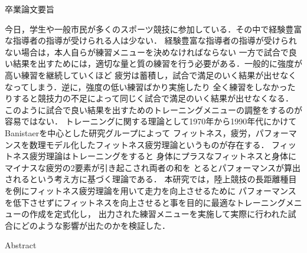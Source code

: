 \documentclass[12pt,fleqn]{jreport}
\begin{document}
\begin{center}
  {\huge 卒業論文要旨}
\end{center}
\vspace{3cm}
\large
今日，学生や一般市民が多くのスポーツ競技に参加している．その中で経験豊富な指導者の指導が受けられる人は少ない．
経験豊富な指導者の指導が受けられない場合は，本人自らが練習メニューを決めなければならない
一方で試合で良い結果を出すためには，適切な量と質の練習を行う必要がある．一般的に強度が高い練習を継続していくほど
疲労は蓄積し，試合で満足のいく結果が出せなくなってしまう．逆に，強度の低い練習ばかり実施したり
全く練習をしなかったりすると競技力の不足によって同じく試合で満足のいく結果が出せなくなる．
このように試合で良い結果を出すためのトレーニングメニューの調整をするのが容易ではない．
トレーニングに関する理論として1970年から1990年代にかけてBanistaerを中心とした研究グループによって
フィットネス，疲労，パフォーマンスを数理モデル化したフィットネス疲労理論というものが存在する\cite{banister}．
フィットネス疲労理論\cite{banister}はトレーニングをすると
身体にプラスなフィットネスと身体にマイナスな疲労の2要素が引き起こされ両者の和を
とるとパフォーマンスが算出されるという考え方に基づく理論である．
本研究では，陸上競技の長距離種目を例にフィットネス疲労理論\cite{banister}を用いて走力を向上させるために
パフォーマンスを低下させずにフィットネスを向上させると事を目的に最適なトレーニングメニューの作成を定式化し，
出力された練習メニューを実施して実際に行われた試合にどのような影響が出たのかを検証した．
\newpage
\thispagestyle{empty}

\begin{center}
  {\huge Abstract}
\end{center}
\vspace{3cm}



\newpage
{}   %
\setlength{\baselineskip}{20pt}   %
\tableofcontents   %
\newpage
\listoffigures   %
\listoftables   %
\clearpage   %
\newpage
\end{document}
